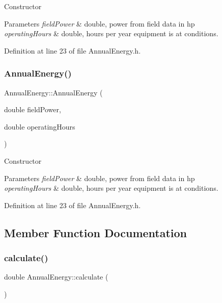 Constructor 
\begin{DoxyParams}{Parameters}
{\em field\+Power} & double, power from field data in hp \\
\hline
{\em operating\+Hours} & double, hours per year equipment is at conditions. \\
\hline
\end{DoxyParams}


Definition at line 23 of file Annual\+Energy.\+h.

\mbox{\label{class_annual_energy_adb693a67965b0ff46436ee5141ab356d}} 
\subsubsection{\texorpdfstring{Annual\+Energy()}{AnnualEnergy()}\hspace{0.1cm}{\footnotesize\ttfamily [3/3]}}
{\footnotesize\ttfamily Annual\+Energy\+::\+Annual\+Energy (\begin{DoxyParamCaption}\item[{double}]{field\+Power,  }\item[{double}]{operating\+Hours }\end{DoxyParamCaption})\hspace{0.3cm}{\ttfamily [inline]}}

Constructor 
\begin{DoxyParams}{Parameters}
{\em field\+Power} & double, power from field data in hp \\
\hline
{\em operating\+Hours} & double, hours per year equipment is at conditions. \\
\hline
\end{DoxyParams}


Definition at line 23 of file Annual\+Energy.\+h.



\subsection{Member Function Documentation}
\mbox{\label{class_annual_energy_ab599860ffb32ce20a1042a3e9d2ad57f}} 
\subsubsection{\texorpdfstring{calculate()}{calculate()}\hspace{0.1cm}{\footnotesize\ttfamily [1/3]}}
{\footnotesize\ttfamily double Annual\+Energy\+::calculate (\begin{DoxyParamCaption}{ }\end{DoxyParamCaption})}



